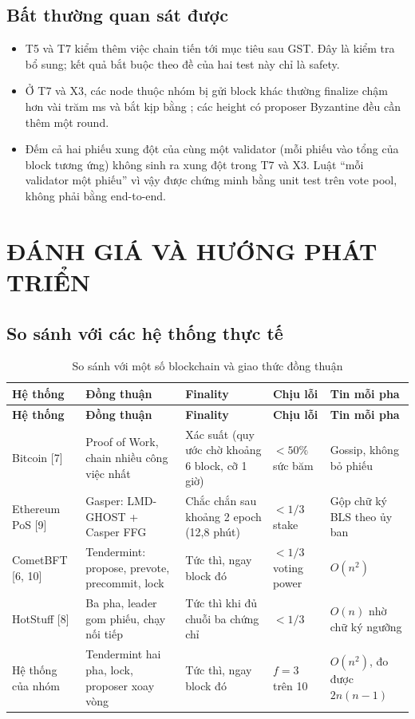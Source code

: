 \documentclass[a4paper,12pt]{article}
\newcommand{\code}[1]{\texttt{\detokenize{#1}}}
\newcommand{\tablefont}{\fontsize{10.5}{12.6}\selectfont}
\begin{document}
\subsection{Bất thường quan sát được}
\begin{itemize}
\item T5 và T7 kiểm thêm việc chain tiến tới mục tiêu sau GST. Đây là kiểm tra bổ sung; kết quả bắt buộc theo
đề của hai test này chỉ là safety.
\item Ở T7 và X3, các node thuộc nhóm bị gửi block khác thường finalize chậm hơn vài trăm ms và bắt kịp bằng
\code{COMMIT}; các height có proposer Byzantine đều cần thêm một round.
\item Đếm cả hai phiếu xung đột của cùng một validator (mỗi phiếu vào tổng của block tương ứng) không sinh ra
xung đột trong T7 và X3. Luật ``mỗi validator một phiếu'' vì vậy được chứng minh bằng unit test trên vote
pool, không phải bằng end-to-end.
\end{itemize}

\section{ĐÁNH GIÁ VÀ HƯỚNG PHÁT TRIỂN}
\subsection{So sánh với các hệ thống thực tế}
{\tablefont
\setlength{\LTpre}{2pt}\setlength{\LTpost}{2pt}
\begin{longtable}{@{}P{24mm} P{40mm} P{34mm} P{25mm} P{33mm}@{}}
\caption{So sánh với một số blockchain và giao thức đồng thuận}\label{tab:compare}\\
\toprule
\textbf{Hệ thống} & \textbf{Đồng thuận} & \textbf{Finality} & \textbf{Chịu lỗi} & \textbf{Tin mỗi pha} \\ \midrule
\endfirsthead
\toprule
\textbf{Hệ thống} & \textbf{Đồng thuận} & \textbf{Finality} & \textbf{Chịu lỗi} & \textbf{Tin mỗi pha} \\ \midrule
\endhead
Bitcoin [7] & Proof of Work, chain nhiều công việc nhất & Xác suất (quy ước chờ khoảng 6 block, cỡ 1 giờ) & $< 50\%$ sức băm & Gossip, không bỏ phiếu \\
Ethereum PoS [9] & Gasper: LMD-GHOST + Casper FFG & Chắc chắn sau khoảng 2 epoch (12,8 phút) & $< 1/3$ stake & Gộp chữ ký BLS theo ủy ban \\
CometBFT [6, 10] & Tendermint: propose, prevote, precommit, lock & Tức thì, ngay block đó & $< 1/3$ voting power & $O(n^2)$ \\
HotStuff [8] & Ba pha, leader gom phiếu, chạy nối tiếp & Tức thì khi đủ chuỗi ba chứng chỉ & $< 1/3$ & $O(n)$ nhờ chữ ký ngưỡng \\
Hệ thống của nhóm & Tendermint hai pha, lock, proposer xoay vòng & Tức thì, ngay block đó & $f = 3$ trên 10 & $O(n^2)$, đo được $2n(n-1)$ \\
\bottomrule
\end{longtable}}
\end{document}
